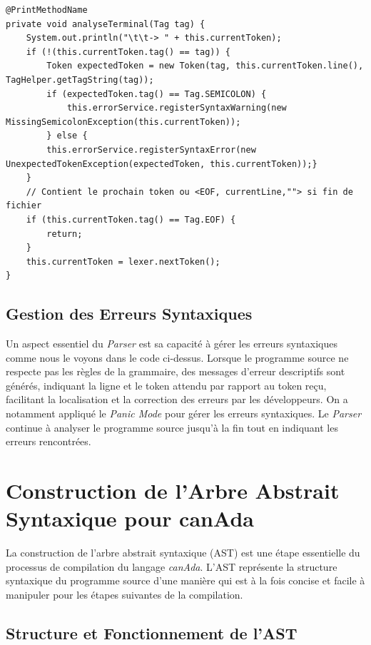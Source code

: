 \documentclass[french,a4paper]{article}
\begin{document}
    \begin{lstlisting}[label={lst:lstlisting11}]
@PrintMethodName
private void analyseTerminal(Tag tag) {
    System.out.println("\t\t-> " + this.currentToken);
    if (!(this.currentToken.tag() == tag)) {
        Token expectedToken = new Token(tag, this.currentToken.line(), TagHelper.getTagString(tag));
        if (expectedToken.tag() == Tag.SEMICOLON) {
            this.errorService.registerSyntaxWarning(new MissingSemicolonException(this.currentToken));
        } else {
        this.errorService.registerSyntaxError(new UnexpectedTokenException(expectedToken, this.currentToken));}
    }
    // Contient le prochain token ou <EOF, currentLine,""> si fin de fichier
    if (this.currentToken.tag() == Tag.EOF) {
        return;
    }
    this.currentToken = lexer.nextToken();
}
    \end{lstlisting}

    \subsection{Gestion des Erreurs Syntaxiques}\label{subsec:gestion-des-erreurs-syntaxiques}

    Un aspect essentiel du \textit{Parser} est sa capacité à gérer les erreurs syntaxiques comme nous le voyons dans le code ci-dessus.
    Lorsque le programme source ne respecte pas les règles de la grammaire, des messages d'erreur descriptifs sont générés, indiquant la ligne et le token attendu par rapport au token reçu, facilitant la localisation et la correction des erreurs par les développeurs.
    On a notamment appliqué le \textit{Panic Mode} pour gérer les erreurs syntaxiques.
    Le \textit{Parser} continue à analyser le programme source jusqu'à la fin tout en indiquant les erreurs rencontrées.

    \section{Construction de l'Arbre Abstrait Syntaxique pour canAda}\label{sec:construction-de-l'arbre-abstrait-syntaxique-pour-canada}

    La construction de l'arbre abstrait syntaxique (AST) est une étape essentielle du processus de compilation du langage \textit{canAda}.
    L'AST représente la structure syntaxique du programme source d'une manière qui est à la fois concise et facile à manipuler pour les étapes suivantes de la compilation.

    \subsection{Structure et Fonctionnement de l'AST}\label{subsec:structure-et-fonctionnement-de-l'ast}
\end{document}
